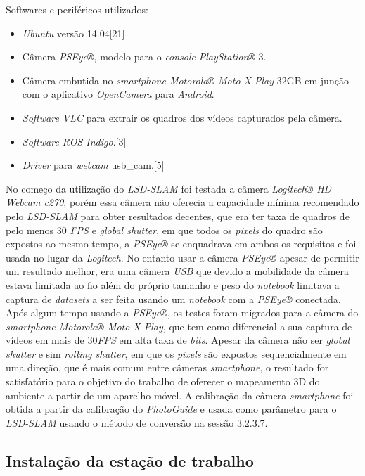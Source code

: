 Softwares e periféricos utilizados:

\begin{itemize}
	\item{\textit{Ubuntu} versão 14.04[21]}
	\item{Câmera \textit{PSEye®}, modelo para o \textit{console} \textit{PlayStation®} 3.}
	\item{Câmera embutida no \textit{smartphone Motorola® Moto X Play} 32GB em junção com o aplicativo \textit{OpenCamera} para \textit{Android}.}
	\item{\textit{Software VLC} para extrair os quadros dos vídeos capturados pela câmera.}
	\item{\textit{Software ROS Indigo}.[3]}
	\item{\textit{Driver} para \textit{webcam} usb\_cam.[5]}
\end{itemize}

No começo da utilização do \textit{LSD-SLAM} foi testada a câmera \textit{Logitech® HD Webcam c270}, porém essa câmera não oferecia a capacidade mínima recomendado pelo \textit{LSD-SLAM} para obter resultados decentes, que era ter taxa de quadros de pelo menos 30 \textit{FPS} e \textit{global shutter}, em que todos os \textit{pixels} do quadro são expostos ao mesmo tempo, a \textit{PSEye®} se enquadrava em ambos os requisitos e foi usada no lugar da \textit{Logitech}. No entanto usar a câmera \textit{PSEye®} apesar de permitir um resultado melhor, era uma câmera \textit{USB} que devido a mobilidade da câmera estava limitada ao fio além do próprio tamanho e peso do \textit{notebook} limitava a captura de \textit{datasets} a ser feita usando um \textit{notebook} com a \textit{PSEye®} conectada. Após algum tempo usando a \textit{PSEye®}, os testes foram migrados para a câmera do \textit{smartphone Motorola® Moto X Play}, que tem como diferencial a sua captura de vídeos em mais de 30\textit{FPS} em alta taxa de \textit{bits}. Apesar da câmera não ser \textit{global shutter} e sim \textit{rolling shutter}, em que os \textit{pixels} são expostos sequencialmente em uma direção, que é mais comum entre câmeras \textit{smartphone}, o resultado for satisfatório para o objetivo do trabalho de oferecer o mapeamento 3D do ambiente a partir de um aparelho móvel. A calibração da câmera \textit{smartphone} foi obtida a partir da calibração do \textit{PhotoGuide} e usada como parâmetro para o \textit{LSD-SLAM} usando o método de conversão na sessão 3.2.3.7.

\subsection{Instalação da estação de trabalho}

